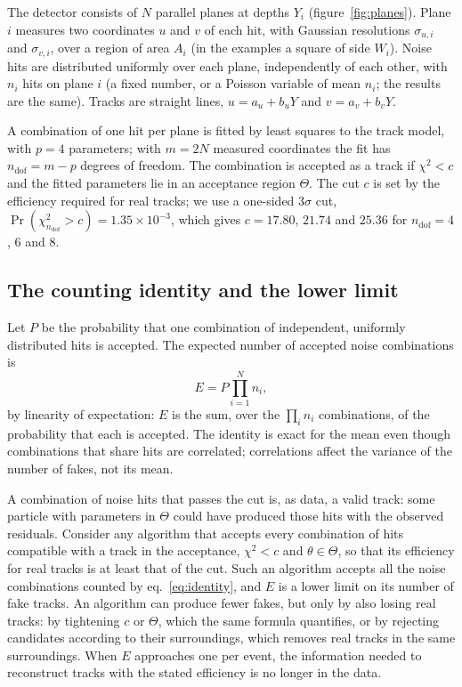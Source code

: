 \IfFileExists{jinst.cls}{\documentclass[a4paper,11pt]{jinst}}
\newcommand{\ndof}{n_\mathrm{dof}}
\begin{document}
The detector consists of $N$ parallel planes at depths $Y_i$ (figure~\ref{fig:planes}). Plane $i$ measures two
coordinates $u$ and $v$ of each hit, with Gaussian resolutions $\sigma_{u,i}$ and
$\sigma_{v,i}$, over a region of area $A_i$ (in the examples a square of side $W_i$). Noise
hits are distributed uniformly over each plane, independently of each other, with $n_i$ hits
on plane $i$ (a fixed number, or a Poisson variable of mean $n_i$; the results are the same).
Tracks are straight lines, $u=a_u+b_uY$ and $v=a_v+b_vY$.

A combination of one hit per plane is fitted by least squares to the track model, with $p=4$
parameters; with $m=2N$ measured coordinates the fit has $\ndof=m-p$ degrees of freedom. The
combination is accepted as a track if $\chi^2<c$ and the fitted parameters lie in an
acceptance region $\Theta$. The cut $c$ is set by the efficiency required for real tracks; we
use a one-sided $3\sigma$ cut, $\Pr(\chi^2_{\ndof}>c)=1.35\times10^{-3}$, which gives
$c=17.80$, $21.74$ and $25.36$ for $\ndof=4$, $6$ and $8$.

\subsection{The counting identity and the lower limit}\label{sec:limit}

Let $P$ be the probability that one combination of independent, uniformly distributed hits
is accepted. The expected number of accepted noise combinations is
\begin{equation}
  E = P\prod_{i=1}^{N} n_i ,
  \label{eq:identity}
\end{equation}
by linearity of expectation: $E$ is the sum, over the $\prod_i n_i$ combinations, of the
probability that each is accepted. The identity is exact for the mean even though
combinations that share hits are correlated; correlations affect the variance of the number
of fakes, not its mean.

A combination of noise hits that passes the cut is, as data, a valid track: some particle
with parameters in $\Theta$ could have produced those hits with the observed residuals.
Consider any algorithm that accepts every combination of hits compatible with a track in the
acceptance, $\chi^2<c$ and $\theta\in\Theta$, so that its efficiency for real tracks is at
least that of the cut. Such an algorithm accepts all the noise combinations counted by
eq.~\eqref{eq:identity}, and $E$ is a lower limit on its number of fake tracks. An algorithm
can produce fewer fakes, but only by also losing real tracks: by tightening $c$ or $\Theta$,
which the same formula quantifies, or by rejecting candidates according to their
surroundings, which removes real tracks in the same surroundings. When $E$ approaches one per
event, the information needed to reconstruct tracks with the stated efficiency is no longer in
the data.
\end{document}
